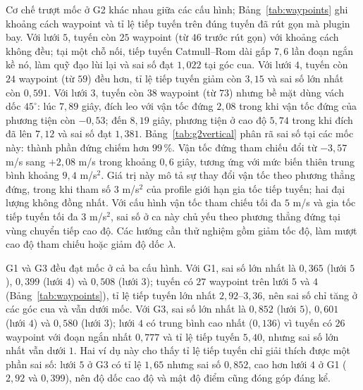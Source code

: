 Cơ chế trượt mốc ở G2 khác nhau giữa các cấu hình; Bảng~\ref{tab:waypoints} ghi
khoảng cách waypoint và tỉ lệ tiếp tuyến trên đúng tuyến đã rút gọn mà plugin
bay. Với lưới $5$, tuyến còn $25$ waypoint (từ $46$ trước rút gọn) với khoảng
cách không đều; tại một chỗ nối, tiếp tuyến Catmull--Rom dài gấp $7{,}6$ lần đoạn
ngắn kề nó, làm quỹ đạo lùi lại và sai số đạt $1{,}022$ tại góc cua. Với lưới
$4$, tuyến còn $24$ waypoint (từ $59$) đều hơn, tỉ lệ tiếp tuyến giảm còn $3{,}15$
và sai số lớn nhất còn $0{,}591$. Với lưới $3$, tuyến còn $38$ waypoint (từ $73$)
nhưng bề mặt dùng vách dốc $45^\circ$: lúc $7{,}89$ giây, đích leo với vận tốc
đứng $2{,}08$ trong khi vận tốc đứng của phương tiện còn $-0{,}53$; đến
$8{,}19$ giây, phương tiện ở cao độ $5{,}74$ trong khi đích đã lên $7{,}12$ và sai
số đạt $1{,}381$. Bảng~\ref{tab:g2vertical} phân rã sai số tại các mốc này: thành phần đứng chiếm hơn $99\,\%$. Vận tốc đứng tham chiếu
đổi từ $-3{,}57$ m/s sang $+2{,}08$ m/s trong khoảng
$0{,}6$ giây, tương ứng với mức biến thiên trung bình khoảng
$9{,}4$ m/s$^2$. Giá trị này mô tả sự thay đổi vận tốc theo
phương thẳng đứng, trong khi tham số $3$ m/s$^2$ của profile
giới hạn gia tốc tiếp tuyến; hai đại lượng không đồng nhất.
Với cấu hình vận tốc tham chiếu tối đa $5$ m/s và gia tốc
tiếp tuyến tối đa $3$ m/s$^2$, sai số ở ca này chủ yếu theo
phương thẳng đứng tại vùng chuyển tiếp cao độ.
Các hướng cần thử nghiệm gồm giảm tốc độ, làm mượt cao độ
tham chiếu hoặc giảm độ dốc $\lambda$.

G1 và G3 đều đạt mốc ở cả ba cấu hình. Với G1, sai số lớn nhất là $0{,}365$
(lưới $5$), $0{,}399$ (lưới $4$) và $0{,}508$ (lưới $3$); tuyến có $27$ waypoint
trên lưới $5$ và $4$ (Bảng~\ref{tab:waypoints}), tỉ lệ tiếp tuyến lớn nhất
$2{,}92$--$3{,}36$, nên sai số chỉ tăng ở các góc cua và vẫn dưới mốc. Với G3, sai số lớn nhất là $0{,}852$ (lưới
$5$), $0{,}601$ (lưới $4$) và $0{,}580$ (lưới $3$); lưới $4$ có trung bình cao
nhất ($0{,}136$) vì tuyến có $26$ waypoint với đoạn ngắn nhất $0{,}777$ và tỉ lệ
tiếp tuyến $5{,}40$, nhưng sai số lớn nhất vẫn dưới $1$. Hai ví dụ này cho thấy
tỉ lệ tiếp tuyến chỉ giải thích được một phần sai số: lưới $5$ ở G3 có tỉ lệ
$1{,}65$ nhưng sai số $0{,}852$, cao hơn lưới $4$ ở G1 ($2{,}92$ và $0{,}399$),
nên độ dốc cao độ và mật độ điểm cũng đóng góp đáng kể.

